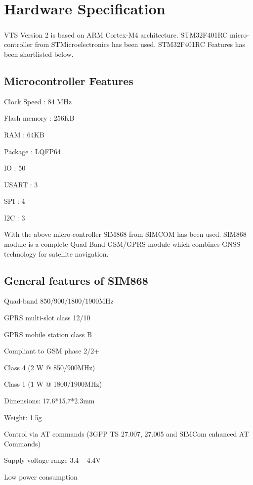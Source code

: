 \chapter{Hardware Specification}
\paragraph*{}
VTS Version 2 is based on ARM Cortex-M4 architecture. STM32F401RC micro-controller from STMicroelectronics has been used. STM32F401RC Features has been shortlisted below.

\section*{Microcontroller Features}
\begin{center}
		\item[Clock Speed] 	: 84 MHz
		\item[Flash memory]	: 256KB
		\item[RAM] 			: 64KB
		\item[Package] 		: LQFP64
		\item[IO]			: 50
		\item[USART] 		: 3
		\item[SPI]			: 4
		\item[I2C]			: 3
\end{center}

With the above micro-controller SIM868 from SIMCOM has been used. SIM868 module is a complete Quad-Band GSM/GPRS module which combines GNSS technology for satellite navigation.
\pagebreak
\section*{General features of SIM868}
\begin{flushleft}
	\item Quad-band 850/900/1800/1900MHz 
	\item GPRS multi-slot class 12/10
	\item GPRS mobile station class B
	\item Compliant to GSM phase 2/2+
	\item Class 4 (2 W @ 850/900MHz)
	\item Class 1 (1 W @ 1800/1900MHz)
	\item Dimensions: 17.6*15.7*2.3mm
	\item Weight: 1.5g
	\item Control via AT commands (3GPP TS 27.007, 27.005 and SIMCom enhanced AT Commands)
	\item Supply voltage range 3.4 ~ 4.4V
	\item Low power consumption
\end{flushleft}

